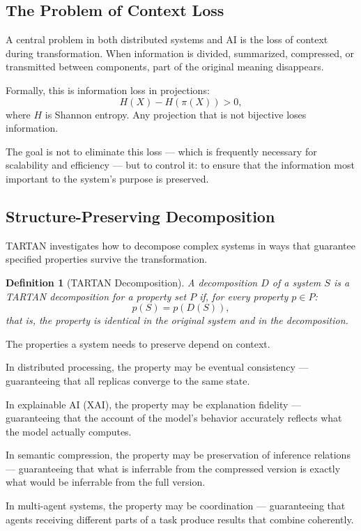 \documentclass[11pt, a4paper]{article}
\theoremstyle{named}
\newtheorem{definition}{Definition}
\begin{document}
\subsection{The Problem of Context Loss}

A central problem in both distributed systems and AI is the loss of
context during transformation. When information is divided, summarized,
compressed, or transmitted between components, part of the original
meaning disappears.

Formally, this is information loss in projections:
\[
  H(X) - H(\pi(X)) > 0,
\]
where $H$ is Shannon entropy. Any projection that is not bijective
loses information.

The goal is not to eliminate this loss --- which is frequently
necessary for scalability and efficiency --- but to control it:
to ensure that the information most important to the system's purpose
is preserved.

\subsection{Structure-Preserving Decomposition}

TARTAN investigates how to decompose complex systems in ways that
guarantee specified properties survive the transformation.

\begin{definition}[TARTAN Decomposition]
A decomposition $D$ of a system $S$ is a TARTAN decomposition for
a property set $P$ if, for every property $p \in P$:
\[
  p(S) = p(D(S)),
\]
that is, the property is identical in the original system and in the
decomposition.
\end{definition}

The properties a system needs to preserve depend on context.

In distributed processing, the property may be eventual consistency
--- guaranteeing that all replicas converge to the same state.

In explainable AI (XAI), the property may be explanation fidelity
--- guaranteeing that the account of the model's behavior accurately
reflects what the model actually computes.

In semantic compression, the property may be preservation of inference
relations --- guaranteeing that what is inferrable from the compressed
version is exactly what would be inferrable from the full version.

In multi-agent systems, the property may be coordination ---
guaranteeing that agents receiving different parts of a task produce
results that combine coherently.
\end{document}
